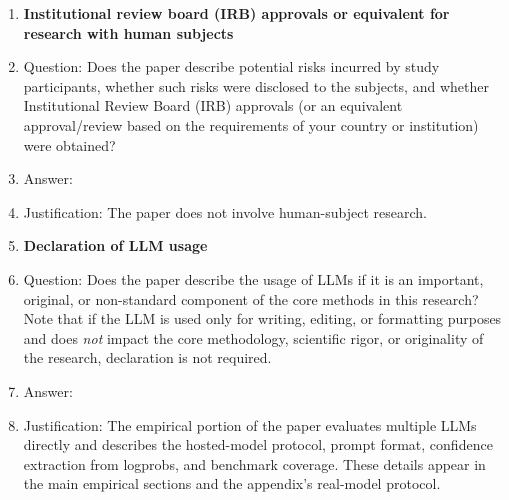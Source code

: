 \begin{enumerate}
\item {\bf Institutional review board (IRB) approvals or equivalent for research with human subjects}
    \item[] Question: Does the paper describe potential risks incurred by study participants, whether such risks were disclosed to the subjects, and whether Institutional Review Board (IRB) approvals (or an equivalent approval/review based on the requirements of your country or institution) were obtained?
    \item[] Answer: \answerNA{}
    \item[] Justification: The paper does not involve human-subject research.

\item {\bf Declaration of LLM usage}
    \item[] Question: Does the paper describe the usage of LLMs if it is an important, original, or non-standard component of the core methods in this research? Note that if the LLM is used only for writing, editing, or formatting purposes and does \emph{not} impact the core methodology, scientific rigor, or originality of the research, declaration is not required.
    \item[] Answer: \answerYes{}
    \item[] Justification: The empirical portion of the paper evaluates multiple LLMs directly and describes the hosted-model protocol, prompt format, confidence extraction from logprobs, and benchmark coverage. These details appear in the main empirical sections and the appendix's real-model protocol.

\end{enumerate}
